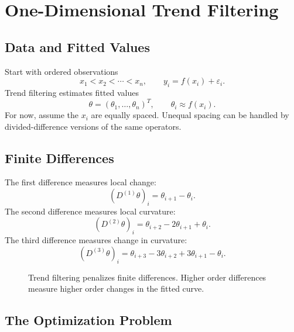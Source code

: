 \documentclass[11pt]{article}
\begin{document}
\section{One-Dimensional Trend Filtering}

\subsection{Data and Fitted Values}

Start with ordered observations
\[
  x_1 < x_2 < \cdots < x_n,
  \qquad
  y_i = f(x_i) + \varepsilon_i.
\]
Trend filtering estimates fitted values
\[
  \theta = (\theta_1,\ldots,\theta_n)^T,
  \qquad
  \theta_i \approx f(x_i).
\]
For now, assume the \(x_i\) are equally spaced.  Unequal spacing can be handled
by divided-difference versions of the same operators.

\subsection{Finite Differences}

The first difference measures local change:
\[
  (D^{(1)}\theta)_i = \theta_{i+1}-\theta_i.
\]
The second difference measures local curvature:
\[
  (D^{(2)}\theta)_i
  =
  \theta_{i+2}-2\theta_{i+1}+\theta_i.
\]
The third difference measures change in curvature:
\[
  (D^{(3)}\theta)_i
  =
  \theta_{i+3}-3\theta_{i+2}+3\theta_{i+1}-\theta_i.
\]

\begin{figure}[ht]
\centering
{}
\caption{Trend filtering penalizes finite differences.  Higher order
differences measure higher order changes in the fitted curve.}
\end{figure}

\subsection{The Optimization Problem}
\end{document}
